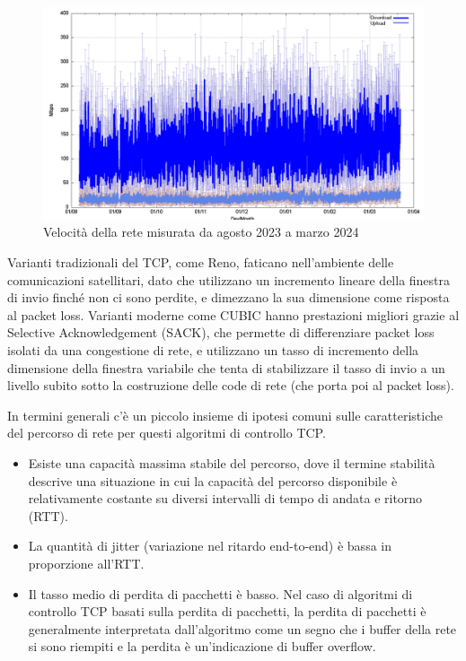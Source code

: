 \begin{figure}[htbp]
  \centering
  \includegraphics[width=0.8\linewidth]{./res/img/starlink_performance.png}
  \caption{Velocità della rete misurata da agosto 2023 a marzo 2024}
  \label{fig:starlink-performance}
\end{figure}

Varianti tradizionali del \ac{TCP}, come Reno, faticano nell'ambiente delle comunicazioni satellitari, dato che utilizzano un incremento lineare della finestra di invio finché non ci sono perdite, e dimezzano la sua dimensione come risposta al packet loss.
Varianti moderne come CUBIC hanno prestazioni migliori grazie al Selective Acknowledgement (SACK), che permette di differenziare packet loss isolati da una congestione di rete, e utilizzano un tasso di incremento della dimensione della finestra variabile che tenta di stabilizzare il tasso di invio a un livello subito sotto la costruzione delle code di rete (che porta poi al packet loss).

In termini generali c'è un piccolo insieme di ipotesi comuni sulle caratteristiche del percorso di rete per questi algoritmi di controllo TCP.
\begin{itemize}
  \item Esiste una capacità massima stabile del percorso, dove il termine stabilità descrive una situazione in cui la capacità del percorso disponibile è relativamente costante su diversi intervalli di tempo di andata e ritorno (RTT).
  \item La quantità di jitter (variazione nel ritardo end-to-end) è bassa in proporzione all'RTT.
  \item Il tasso medio di perdita di pacchetti è basso. Nel caso di algoritmi di controllo TCP basati sulla perdita di pacchetti, la perdita di pacchetti è generalmente interpretata dall'algoritmo come un segno che i buffer della rete si sono riempiti e la perdita è un'indicazione di buffer overflow.
\end{itemize}


